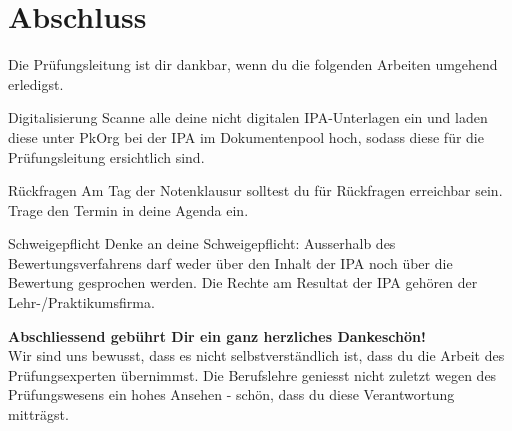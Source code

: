 \section{Abschluss}
Die Prüfungsleitung ist dir dankbar, wenn du die folgenden Arbeiten umgehend erledigst.

\begin{taskitemwithoutcomment}{Digitalisierung}
  Scanne alle deine nicht digitalen IPA-Unterlagen ein und laden diese unter PkOrg bei der IPA im Dokumentenpool hoch, sodass diese für die Prüfungsleitung ersichtlich sind.
\end{taskitemwithoutcomment}
\begin{taskitemwithoutcomment}{Rückfragen}
  Am Tag der Notenklausur solltest du für Rückfragen erreichbar sein. Trage den Termin in deine Agenda ein.
\end{taskitemwithoutcomment}
\begin{taskitemwithoutcomment}{Schweigepflicht}
  Denke an deine Schweigepflicht: Ausserhalb des Bewertungsverfahrens darf weder über den Inhalt der IPA noch über die Bewertung gesprochen werden. Die Rechte am Resultat der IPA gehören der Lehr-/Praktikumsfirma.
\end{taskitemwithoutcomment}

\vspace*{2cm}

\textbf{Abschliessend gebührt Dir ein ganz herzliches Dankeschön!}\\
Wir sind uns bewusst, dass es nicht selbstverständlich ist, dass du die Arbeit des Prüfungsexperten übernimmst. Die Berufslehre geniesst nicht zuletzt wegen des Prüfungswesens ein hohes Ansehen - schön, dass du diese Verantwortung mitträgst.
